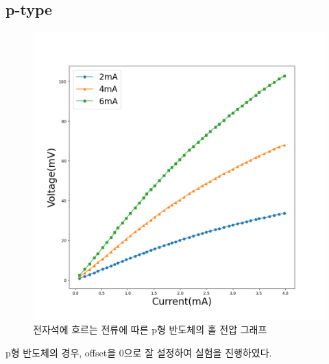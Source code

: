 \documentclass[aps,reprint,superscriptaddress,10pt]{revtex4-2}
\begin{document}
\subsection{p-type}
\begin{figure}[htbp]
  \centering
  \vspace{-0.5cm}
  \includegraphics[scale = 0.3]{Hall_p.png}
  \caption{전자석에 흐르는 전류에 따른 p형 반도체의 홀 전압 그래프}\label{fig:p}
\end{figure}
p형 반도체의 경우, offset을 0으로 잘 설정하여 실험을 진행하였다.
\end{document}
